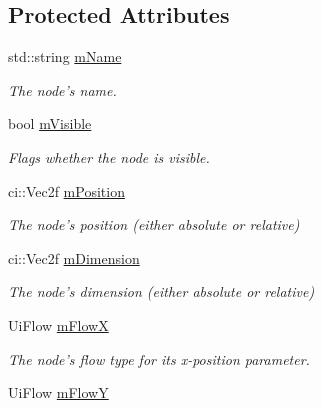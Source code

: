\subsection*{Protected Attributes}
\begin{DoxyCompactItemize}
\item 
\hypertarget{class_ui_base_a614551f6b981316eed87f18016fdf2ea}{std\-::string \hyperlink{class_ui_base_a614551f6b981316eed87f18016fdf2ea}{m\-Name}}\label{class_ui_base_a614551f6b981316eed87f18016fdf2ea}

\begin{DoxyCompactList}\small\item\em The node's name. \end{DoxyCompactList}\item 
\hypertarget{class_ui_base_a67321e80a0be7ade356d639896106475}{bool \hyperlink{class_ui_base_a67321e80a0be7ade356d639896106475}{m\-Visible}}\label{class_ui_base_a67321e80a0be7ade356d639896106475}

\begin{DoxyCompactList}\small\item\em Flags whether the node is visible. \end{DoxyCompactList}\item 
\hypertarget{class_ui_base_add28a553e310fde40acc280686290350}{ci\-::\-Vec2f \hyperlink{class_ui_base_add28a553e310fde40acc280686290350}{m\-Position}}\label{class_ui_base_add28a553e310fde40acc280686290350}

\begin{DoxyCompactList}\small\item\em The node's position (either absolute or relative) \end{DoxyCompactList}\item 
\hypertarget{class_ui_base_a03b2566fd9b5c6f26d85f4befe313802}{ci\-::\-Vec2f \hyperlink{class_ui_base_a03b2566fd9b5c6f26d85f4befe313802}{m\-Dimension}}\label{class_ui_base_a03b2566fd9b5c6f26d85f4befe313802}

\begin{DoxyCompactList}\small\item\em The node's dimension (either absolute or relative) \end{DoxyCompactList}\item 
\hypertarget{class_ui_base_af87b700f299eb04b9def30b471c916c1}{Ui\-Flow \hyperlink{class_ui_base_af87b700f299eb04b9def30b471c916c1}{m\-Flow\-X}}\label{class_ui_base_af87b700f299eb04b9def30b471c916c1}

\begin{DoxyCompactList}\small\item\em The node's flow type for its x-\/position parameter. \end{DoxyCompactList}\item 
\hypertarget{class_ui_base_aae06a3600f72830ef661465d022572ef}{Ui\-Flow \hyperlink{class_ui_base_aae06a3600f72830ef661465d022572ef}{m\-Flow\-Y}}\label{class_ui_base_aae06a3600f72830ef661465d022572ef}


\end{DoxyCompactItemize}

